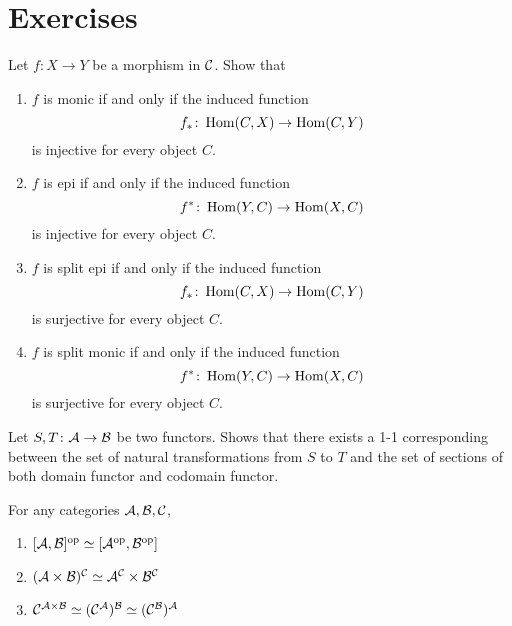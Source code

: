 \newpage\section{Exercises}
\begin{ex}
  Let $f\colon X\to Y$ be a morphism in ${\cal C}$. Show that
  \begin{enumerate}
    \item $f$ is monic if and only if the induced function
               \begin{equation*}
                 f_{\ast}\colon\operatorname{Hom}(C,X)\to\operatorname{Hom}(C,Y)
               \end{equation*}
               is injective for every object $C$.
    \item $f$ is epi if and only if the induced function
               \begin{equation*}
                 f^{\ast}\colon\operatorname{Hom}(Y,C)\to\operatorname{Hom}(X,C)
               \end{equation*}
               is injective for every object $C$.
    \item $f$ is split epi if and only if the induced function
               \begin{equation*}
                 f_{\ast}\colon\operatorname{Hom}(C,X)\to\operatorname{Hom}(C,Y)
               \end{equation*}
               is surjective for every object $C$.
    \item $f$ is split monic if and only if the induced function
               \begin{equation*}
                 f^{\ast}\colon\operatorname{Hom}(Y,C)\to\operatorname{Hom}(X,C)
               \end{equation*}
               is surjective for every object $C$.
  \end{enumerate}
\end{ex}
\begin{ex}
  Let $S,T\colon{\cal A}\to{\cal B}$ be two functors. Shows that there exists a 1-1 corresponding between the set of natural transformations from $S$ to $T$ and the set of sections of both domain functor and codomain functor.
\end{ex}
\begin{ex}\label{prop:power law for functor}
  For any categories ${\cal A},{\cal B},{\cal C}$,
  \begin{enumerate}
    \item $[{\cal A},{\cal B}]^{\operatorname{op}}\simeq[{\cal A}^{\operatorname{op}},{\cal B}^{\operatorname{op}}]$
    \item $({\cal A}\times{\cal B})^{{\cal C}}\simeq{\cal A}^{{\cal C}}\times{\cal B}^{{\cal C}}$
    \item ${\cal C}^{{\cal A}\times{\cal B}}\simeq({\cal C}^{{\cal A}})^{{\cal B}}\simeq({\cal C}^{{\cal B}})^{{\cal A}}$
  \end{enumerate}
\end{ex}
